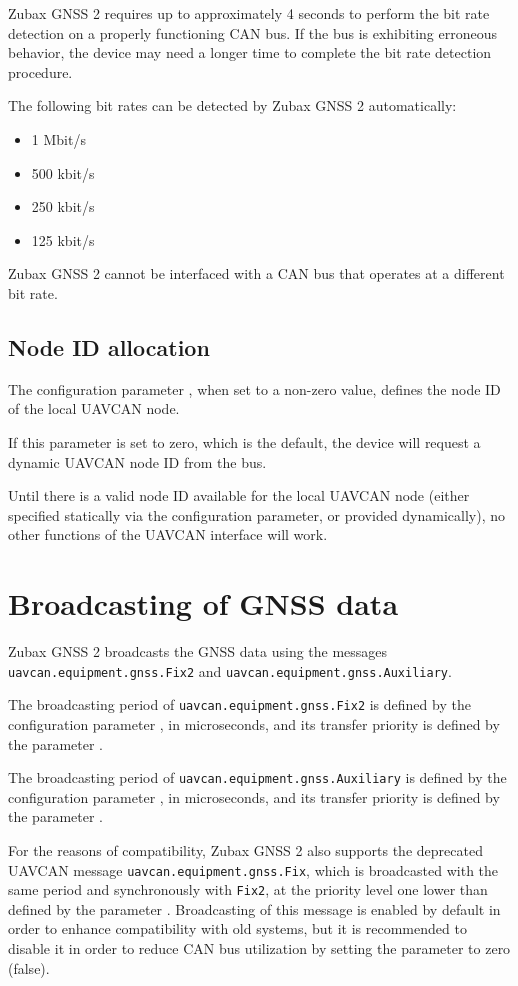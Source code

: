 \documentclass{zubaxdoc}
\begin{document}
Zubax GNSS 2 requires up to approximately 4 seconds to perform the bit rate detection on a properly
functioning CAN bus.
If the bus is exhibiting erroneous behavior, the device may need a longer time to complete the bit rate
detection procedure.

The following bit rates can be detected by Zubax GNSS 2 automatically:
\begin{itemize}
\item 1 Mbit/s
\item 500 kbit/s
\item 250 kbit/s
\item 125 kbit/s
\end{itemize}
Zubax GNSS 2 cannot be interfaced with a CAN bus that operates at a different bit rate.

\subsection{Node ID allocation}

The configuration parameter , when set to a non-zero value,
defines the node ID of the local UAVCAN node.

If this parameter is set to zero, which is the default, the device will request a dynamic UAVCAN node ID
from the bus.

Until there is a valid node ID available for the local UAVCAN node (either specified
statically via the configuration parameter, or provided dynamically),
no other functions of the UAVCAN interface will work.

\section{Broadcasting  of GNSS data}

Zubax GNSS 2 broadcasts the GNSS data using the messages
\verb|uavcan.equipment.gnss.Fix2| and \verb|uavcan.equipment.gnss.Auxiliary|.

The broadcasting period of \verb|uavcan.equipment.gnss.Fix2| is defined by the configuration
parameter , in microseconds, and its transfer priority is defined by the
parameter .

The broadcasting period of \verb|uavcan.equipment.gnss.Auxiliary| is defined by the configuration
parameter , in microseconds, and its transfer priority is defined by the
parameter .

For the reasons of compatibility, Zubax GNSS 2 also supports the deprecated UAVCAN message
\verb|uavcan.equipment.gnss.Fix|, which is broadcasted with the same period and
synchronously with \verb|Fix2|, at the priority level one lower than
defined by the parameter .
Broadcasting of this message is enabled by default in order to enhance compatibility with old systems,
but it is recommended to disable it in order to reduce CAN bus utilization by setting
the parameter  to zero (false).
\end{document}

